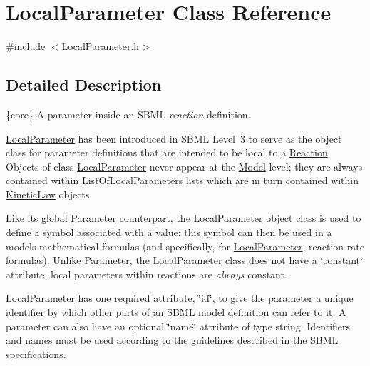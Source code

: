 \hypertarget{class_local_parameter}{}\section{Local\+Parameter Class Reference}
\label{class_local_parameter}


{\ttfamily \#include $<$Local\+Parameter.\+h$>$}



\subsection{Detailed Description}
\{core\} A parameter inside an S\+B\+ML {\itshape reaction} definition.

\hyperlink{class_local_parameter}{Local\+Parameter} has been introduced in S\+B\+ML Level~3 to serve as the object class for parameter definitions that are intended to be local to a \hyperlink{class_reaction}{Reaction}. Objects of class \hyperlink{class_local_parameter}{Local\+Parameter} never appear at the \hyperlink{class_model}{Model} level; they are always contained within \hyperlink{class_list_of_local_parameters}{List\+Of\+Local\+Parameters} lists which are in turn contained within \hyperlink{class_kinetic_law}{Kinetic\+Law} objects.

Like its global \hyperlink{class_parameter}{Parameter} counterpart, the \hyperlink{class_local_parameter}{Local\+Parameter} object class is used to define a symbol associated with a value; this symbol can then be used in a model\textquotesingle{}s mathematical formulas (and specifically, for \hyperlink{class_local_parameter}{Local\+Parameter}, reaction rate formulas). Unlike \hyperlink{class_parameter}{Parameter}, the \hyperlink{class_local_parameter}{Local\+Parameter} class does not have a \char`\"{}constant\char`\"{} attribute\+: local parameters within reactions are {\itshape always} constant.

\hyperlink{class_local_parameter}{Local\+Parameter} has one required attribute, \char`\"{}id\char`\"{}, to give the parameter a unique identifier by which other parts of an S\+B\+ML model definition can refer to it. A parameter can also have an optional \char`\"{}name\char`\"{} attribute of type {\ttfamily string}. Identifiers and names must be used according to the guidelines described in the S\+B\+ML specifications.

